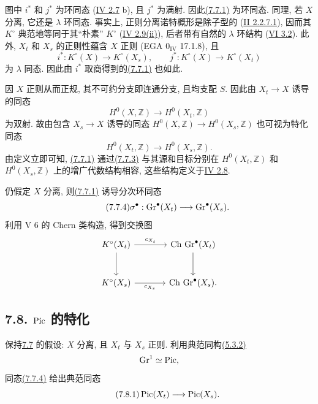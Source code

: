 图中 $i^*$ 和 $j^*$ 为环同态 (\hyperlink{sga6.e04.para.2-7}{IV 2.7} b), 且 $j^*$ 为满射. 因此\hyperlink{sga6.e10.eq.7-7-1}{(7.7.1)} 为环同态. 同理, 若 $X$ 分离, 它还是 $\lambda$ 环同态. 事实上, 正则分离诺特概形是除子型的 (\hyperlink{sga6.e02.cor.2-2-7-1}{II 2.2.7.1}), 因而其 $K^\circ$ 典范地等同于其“朴素” $K^\circ$ (\hyperlink{sga6.e04.para.2-9}{IV 2.9(ii)}), 后者带有自然的 $\lambda$ 环结构 (\hyperlink{sga6.e06.thm.3-2}{VI 3.2}). 此外, $X_t$ 和 $X_s$ 的正则性蕴含 $X$ 正则 (EGA $0_{\mathrm{IV}}$ 17.1.8), 且
%
%
%
%
%
%
%
\[
i^*:K^\circ(X)\longrightarrow K^\circ(X_s),
\qquad
j^*:K^\circ(X)\longrightarrow K^\circ(X_t)
\]
为 $\lambda$ 同态. 因此由 $i^*$ 取商得到的\hyperlink{sga6.e10.eq.7-7-1}{(7.7.1)} 也如此.
%

因 $X$ 正则从而正规, 其不可约分支即连通分支, 且均支配 $S$. 因此由 $X_t\to X$ 诱导的同态
%
\[
H^0(X,\mathbb Z)\longrightarrow H^0(X_t,\mathbb Z)
\]
为双射. 故由包含 $X_s\to X$ 诱导的同态 $H^0(X,\mathbb Z)\to H^0(X_s,\mathbb Z)$ 也可视为特化同态
%
\begin{equation}\tag{7.7.3}
H^0(X_t,\mathbb Z)\longrightarrow H^0(X_s,\mathbb Z).
\end{equation}
由定义立即可知, \hyperlink{sga6.e10.eq.7-7-1}{(7.7.1)} 通过\hyperlink{sga6.e10.eq.7-7-3}{(7.7.3)} 与其源和目标分别在 $H^0(X_t,\mathbb Z)$ 和 $H^0(X_s,\mathbb Z)$ 上的增广代数结构相容, 这些结构定义于\hyperlink{sga6.e04.para.2-8}{IV 2.8}.
%
%
%

仍假定 $X$ 分离, 则\hyperlink{sga6.e10.eq.7-7-1}{(7.7.1)} 诱导分次环同态
%
\begin{equation}\tag{7.7.4}
\sigma^\bullet:\operatorname{Gr}^\bullet(X_t)\longrightarrow\operatorname{Gr}^\bullet(X_s).
\end{equation}
利用 V 6 的 Chern 类构造, 得到交换图
%
\[
\begin{tikzcd}[column sep=large,row sep=large]
K^\circ(X_t) \arrow[r,"c_{X_t}"] \arrow[d] &
\Ch\,\Gr^\bullet(X_t) \arrow[d]\\
K^\circ(X_s) \arrow[r,"c_{X_s}"'] &
\Ch\,\Gr^\bullet(X_s).
\end{tikzcd}
\]

\subsection*{7.8. $\operatorname{Pic}$ 的特化} 保持\hyperlink{sga6.e10.sec.7.7}{7.7} 的假设: $X$ 分离, 且 $X_t$ 与 $X_s$ 正则. 利用典范同构\hyperlink{sga6.e10.thm.5-3-2}{(5.3.2)}
%
%
\[
\operatorname{Gr}^1\simeq\operatorname{Pic},
\]
同态\hyperlink{sga6.e10.eq.7-7-4}{(7.7.4)} 给出典范同态
\begin{equation}\tag{7.8.1}
\operatorname{Pic}(X_t)\longrightarrow\operatorname{Pic}(X_s).
\end{equation}

